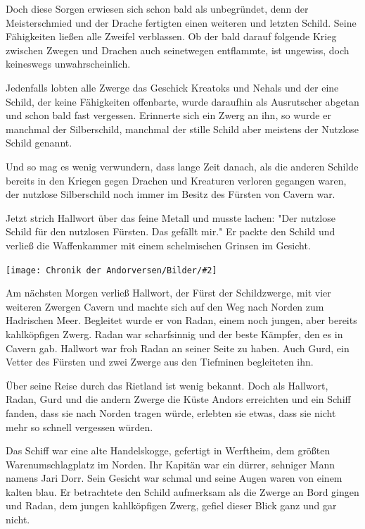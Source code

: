 \documentclass[10pt, a4paper, oneside]{book}
\newcommand{\bildmitts}[2][height=0.32\textwidth,width=0.48\textwidth,keepaspectratio]{%
    \begin{center}
        \texttt{[image: Chronik der Andorversen/Bilder/\#2]}
    \end{center}
}
\begin{document}
\begin{multicols}{2}
Doch diese Sorgen erwiesen sich schon bald als unbegründet, denn der Meisterschmied und der Drache fertigten einen weiteren und letzten Schild. Seine Fähigkeiten ließen alle Zweifel verblassen. Ob der bald darauf folgende Krieg zwischen Zwegen und Drachen auch seinetwegen entflammte, ist ungewiss, doch keineswegs unwahrscheinlich.

Jedenfalls lobten alle Zwerge das Geschick Kreatoks und Nehals und der eine Schild, der keine Fähigkeiten offenbarte, wurde daraufhin als Ausrutscher abgetan und schon bald fast vergessen. Erinnerte sich ein Zwerg an ihn, so wurde er manchmal der Silberschild, manchmal der stille Schild aber meistens der Nutzlose Schild genannt.\bigskip

Und so mag es wenig verwundern, dass lange Zeit danach, als die anderen Schilde bereits in den Kriegen gegen Drachen und Kreaturen verloren gegangen waren, der nutzlose Silberschild noch immer im Besitz des Fürsten von Cavern war.\bigskip

Jetzt strich Hallwort über das feine Metall und musste lachen: "Der nutzlose Schild für den nutzlosen Fürsten. Das gefällt mir." Er packte den Schild und verließ die Waffenkammer mit einem schelmischen Grinsen im Gesicht.\bigskip

\bildmitts{Der Sturmschild Bild 2.png}

Am nächsten Morgen verließ Hallwort, der Fürst der Schildzwerge, mit vier weiteren Zwergen Cavern und machte sich auf den Weg nach Norden zum Hadrischen Meer. Begleitet wurde er von Radan, einem noch jungen, aber bereits kahlköpfigen Zwerg. Radan war scharfsinnig und der beste Kämpfer, den es in Cavern gab. Hallwort war froh Radan an seiner Seite zu haben. Auch Gurd, ein Vetter des Fürsten und zwei Zwerge aus den Tiefminen begleiteten ihn.\bigskip

Über seine Reise durch das Rietland ist wenig bekannt. Doch als Hallwort, Radan, Gurd und die andern Zwerge die Küste Andors erreichten und ein Schiff fanden, dass sie nach Norden tragen würde, erlebten sie etwas, dass sie nicht mehr so schnell vergessen würden.\bigskip

Das Schiff war eine alte Handelskogge, gefertigt in Werftheim, dem größten Warenumschlagplatz im Norden. Ihr Kapitän war ein dürrer, sehniger Mann namens Jari Dorr. Sein Gesicht war schmal und seine Augen waren von einem kalten blau. Er betrachtete den Schild aufmerksam als die Zwerge an Bord gingen und Radan, dem jungen kahlköpfigen Zwerg, gefiel dieser Blick ganz und gar nicht.\bigskip


\end{multicols}
\end{document}
